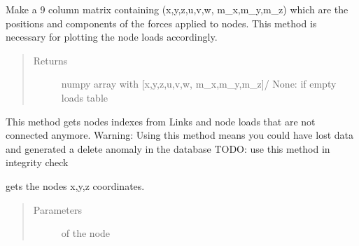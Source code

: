 \documentclass[letterpaper,10pt,english]{sphinxmanual}
\begin{document}
\begin{fulllineitems}
\begin{fulllineitems}
\begin{quote}
\begin{description}
\end{description}\end{quote}

\end{fulllineitems}


\begin{fulllineitems}
\label{\detokenize{api:beamon.database.Database.get_loads_for_plotting}}
Make a 9 column matrix containing (x,y,z,u,v,w, m\_x,m\_y,m\_z) which are the positions and components of the
forces applied to nodes.
This method is necessary for plotting the node loads accordingly.
\begin{quote}\begin{description}
\item[{Returns}] \leavevmode
numpy array with {[}x,y,z,u,v,w, m\_x,m\_y,m\_z{]}/ None: if empty loads table

\end{description}\end{quote}

\end{fulllineitems}


\begin{fulllineitems}
\label{\detokenize{api:beamon.database.Database.get_lost_dependencies}}
This method gets nodes indexes from Links and node loads that are not connected anymore.
Warning: Using this method means you could have lost data and generated a delete anomaly in the database
TODO: use this method in integrity check

\end{fulllineitems}


\begin{fulllineitems}
\label{\detokenize{api:beamon.database.Database.get_node}}
gets the nodes x,y,z coordinates.
\begin{quote}\begin{description}
\item[{Parameters}] \leavevmode
{} \textendash{} of the node


\end{description}
\end{quote}
\end{fulllineitems}
\end{fulllineitems}
\end{document}
